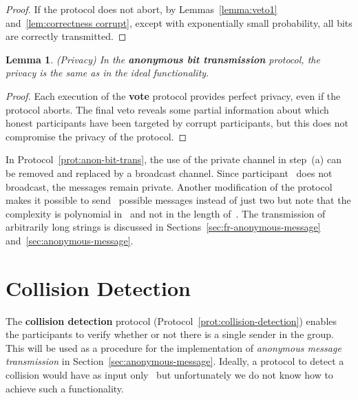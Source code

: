 \documentclass[11pt]{article}
\newtheorem{lemma}[theorem]{Lemma}
\begin{document}
\begin{proof}
If the protocol does not abort, by Lemmas~\ref{lemma:veto1}
and~\ref{lem:correctness corrupt}, except with exponentially small
probability, all bits are correctly transmitted.
\end{proof}

\begin{lemma}(Privacy)
In the \textbf{anonymous bit transmission} protocol, the privacy is
the same as in the ideal functionality.
\end{lemma}

\begin{proof}
Each execution of the \textbf{vote} protocol  provides perfect
privacy, even if the protocol aborts.
 The final veto reveals some partial information about which honest participants
have been targeted by corrupt participants, but this does not
compromise the privacy of the protocol.\end{proof}

In Protocol~\ref{prot:anon-bit-trans}, the use of the private
channel in step~(a) can be removed and replaced by a broadcast
channel. Since participant~ does not broadcast, the messages
remain private. Another  modification of the protocol makes it
possible to send~ possible messages instead of just two but note
that the complexity is polynomial in~ and not in the length
of~. The transmission of arbitrarily long strings is discussed in
Sections~\ref{sec:fr-anonymous-message}
and~\ref{sec:anonymous-message}.


\section{Collision Detection}
\label{sec:collision}

The \textbf{collision detection} protocol
(Protocol~\ref{prot:collision-detection}) enables the participants
to verify whether or not there is a single sender in the group. This
will be used as a procedure for the implementation of
\emph{anonymous message transmission} in
Section~\ref{sec:anonymous-message}. Ideally, a protocol to detect a
collision would have as input only~ but
unfortunately we do not know how to achieve such a functionality.
\end{document}
